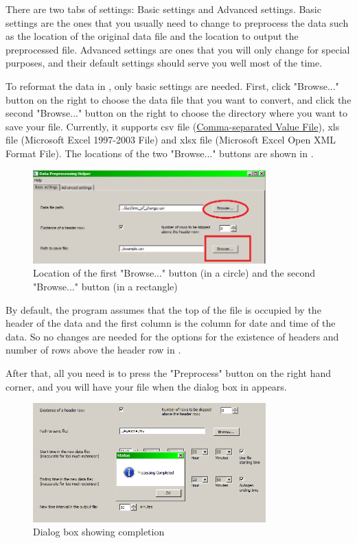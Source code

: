\documentclass[12pt,a4paper]{article}
\begin{document}
There are two tabs of settings: Basic settings and Advanced settings. Basic settings are the ones that you usually need to change to preprocess the data such as the location of the original data file and the location to output the preprocessed file.
Advanced settings are ones that you will only change for special purposes, and their default settings should serve you well most of the time.

To reformat the data in , only basic settings are needed. 
First, click "Browse..." button on the right to choose the data file that you want to convert, and click the second "Browse..." button on the right to choose the directory where you want to save your file.
Currently, it supports csv file (\href{https://en.wikipedia.org/wiki/Comma-separated_values}{Comma-separated Value File}), xls file (Microsoft Excel 1997-2003 File) and xlsx file (Microsoft Excel Open XML Format File).
The locations of the two "Browse..." buttons are shown in .

\begin{figure}[H]
\centering
\includegraphics[width=0.8\textwidth]{ui_zoomed.png}
\caption{Location of the first "Browse..." button (in a circle) and the second "Browse..." button (in a rectangle)}
\label{fig:ui_zoomed}
\end{figure}

By default, the program assumes that the top of the file is occupied by the header of the data and the first column is the column for date and time of the data.
So no changes are needed for the options for the existence of headers and number of rows above the header row in .

After that, all you need is to press the "Preprocess" button on the right hand corner, and you will have your file when the dialog box in  appears.

\begin{figure}[H]
\centering
\includegraphics[width=0.8\textwidth]{complete.png}
\caption{Dialog box showing completion}
\label{fig:complete}
\end{figure}
\end{document}
